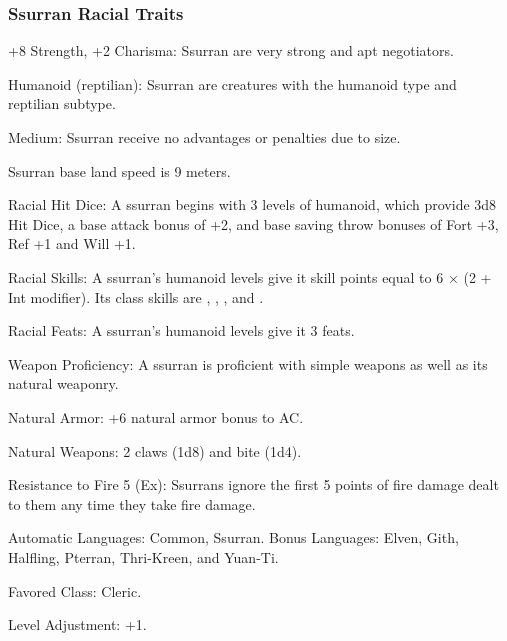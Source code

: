 \subsubsection{Ssurran Racial Traits}
\begin{itemize*}
    \item +8 Strength, +2 Charisma: Ssurran are very strong and apt negotiators.
    \item Humanoid (reptilian): Ssurran are creatures with the humanoid type and reptilian subtype.
    \item Medium: Ssurran receive no advantages or penalties due to size.
    \item Ssurran base land speed is 9 meters.

    \item Racial Hit Dice: A ssurran begins with 3 levels of humanoid, which provide 3d8 Hit Dice, a base attack bonus of +2, and base saving throw bonuses of Fort +3, Ref +1 and  Will +1.
    \item Racial Skills: A ssurran's humanoid levels give it skill points equal to 6 $\times$ (2 + Int modifier). Its class skills are , , , and .
    \item Racial Feats: A ssurran's humanoid levels give it 3 feats.
    \item Weapon Proficiency: A ssurran is proficient with simple weapons as well as its natural weaponry.

    \item Natural Armor: +6 natural armor bonus to AC.
    \item Natural Weapons: 2 claws (1d8) and bite (1d4).

    \item Resistance to Fire 5 (Ex): Ssurrans ignore the first 5 points of fire damage dealt to them any time they take fire damage.

    \item Automatic Languages: Common, Ssurran. Bonus Languages: Elven, Gith, Halfling, Pterran, Thri-Kreen, and Yuan-Ti.
    \item Favored Class: Cleric.
    \item Level Adjustment: +1.
\end{itemize*}
